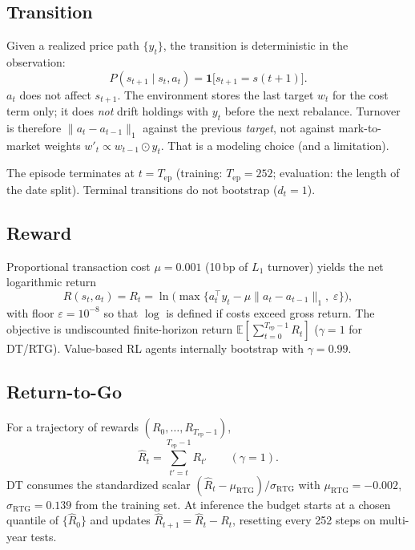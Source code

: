 \documentclass[11pt]{article}
\begin{document}
\subsection{Transition}
Given a realized price path $\{y_t\}$, the transition is deterministic in the observation:
\begin{equation}
  P(s_{t+1}\mid s_t, a_t) = \mathbf{1}\bigl[s_{t+1}=s(t+1)\bigr].
\end{equation}
$a_t$ does not affect $s_{t+1}$. The environment stores the last target $w_t$ for the cost term only; it does \emph{not} drift holdings with $y_t$ before the next rebalance. Turnover is therefore $\lVert a_t - a_{t-1}\rVert_1$ against the previous \emph{target}, not against mark-to-market weights $w'_{t} \propto w_{t-1}\odot y_t$. That is a modeling choice (and a limitation).

The episode terminates at $t=T_{\mathrm{ep}}$ (training: $T_{\mathrm{ep}}=252$; evaluation: the length of the date split). Terminal transitions do not bootstrap ($d_t=1$).

\subsection{Reward}
Proportional transaction cost $\mu=0.001$ (10\,bp of $L_1$ turnover) yields the net logarithmic return
\begin{equation}
  R(s_t,a_t) = R_t
  = \ln\bigl(\max\{ a_t^\top y_t - \mu \lVert a_t - a_{t-1}\rVert_1,\; \varepsilon \}\bigr),
\end{equation}
with floor $\varepsilon=10^{-8}$ so that $\log$ is defined if costs exceed gross return. The objective is undiscounted finite-horizon return $\mathbb{E}[\sum_{t=0}^{T_{\mathrm{ep}}-1} R_t]$ ($\gamma=1$ for DT/RTG). Value-based RL agents internally bootstrap with $\gamma=0.99$.

\subsection{Return-to-Go}
For a trajectory of rewards $(R_0,\ldots,R_{T_{\mathrm{ep}}-1})$,
\begin{equation}
  \hat{R}_t = \sum_{t'=t}^{T_{\mathrm{ep}}-1} R_{t'}
  \qquad (\gamma=1).
\end{equation}
DT consumes the standardized scalar $(\hat{R}_t - \mu_{\mathrm{RTG}})/\sigma_{\mathrm{RTG}}$ with $\mu_{\mathrm{RTG}}=-0.002$, $\sigma_{\mathrm{RTG}}=0.139$ from the training set. At inference the budget starts at a chosen quantile of $\{\hat{R}_0\}$ and updates $\hat{R}_{t+1}=\hat{R}_t-R_t$, resetting every 252 steps on multi-year tests.
\end{document}
